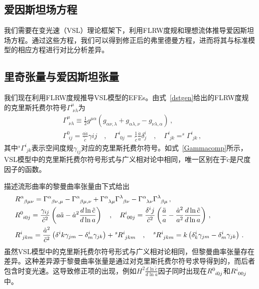 \documentclass[jkps,preprint,fleqn]{revtex4}
\newcommand{\tc}{\tilde{c}}
\begin{document}
\begin{CJK*}{UTF8}{gbsn}
\section{爱因斯坦场方程} \label{sec:EFEs}

我们需要在变光速（VSL）理论框架下，利用FLRW度规和理想流体推导爱因斯坦场方程。通过这些方程，我们可以得到修正后的弗里德曼方程，进而将其与标准模型的相应方程进行对比分析差异。
\subsection{里奇张量与爱因斯坦张量}\label{subsec:RS}
我们现在利用FLRW度规推导VSL模型的EFEs\cite{Lee:2020zts,Lee:2025rpw}。由式~\eqref{dstgen}给出的FLRW度规的克里斯托费尔符号$\Gamma^{\mu}_{\,\,\nu\lambda}$为
\begin{align}
&\Gamma^{\mu}_{\,\,\nu\lambda} \equiv \frac{1}{2} g^{\mu\alpha} \left( g_{\alpha\nu,\lambda} + g_{\alpha\lambda,\nu} - g_{\nu\lambda,\alpha} \right) \label{Gamma}\,, \\ &\Gamma^{0}_{\,\,ij} = \frac{a\dot{a}}{\tc} \gamma{ij} \quad , \quad \Gamma^{i}_{\,\,0j} = \frac{1}{\tc}  \frac{\dot{a}}{a} \delta^i_j \quad , \quad \Gamma^{i}_{\,\,jk} = ^{s}\Gamma^{i}_{\,\,jk}  \label{Gammacomp} \,, \end{align}
其中$^{s}\Gamma^{i}_{\,\,jk}$表示空间度规$\gamma_{ij}$对应的克里斯托费尔符号。如式~\eqref{Gammacomp}所示，VSL模型中的克里斯托费尔符号形式与广义相对论中相同，唯一区别在于$\tc$是尺度因子的函数。

描述流形曲率的黎曼曲率张量由下式给出
\begin{align}
&\tensor{R}{^\alpha_\beta_\mu_\nu} = \tensor{\Gamma}{^\alpha_\beta_\nu_,_\mu} - \tensor{\Gamma}{^\alpha_\beta_\mu_,_\nu} + \tensor{\Gamma}{^\alpha_\lambda_\mu} \tensor{\Gamma}{^\lambda_\beta_\nu} - \tensor{\Gamma}{^\alpha_\lambda_\nu} \tensor{\Gamma}{^\lambda_\beta_\mu} \label{Rabmu} \,, \\ &\tensor{R}{^0_i_0_j} = \frac{\gamma_{ij}}{\tc^2} \left( a \ddot{a} - \dot{a}^2 \frac{d \ln \tc}{d \ln a} \right) \quad , \quad \tensor{R}{^i_0_0_j} = \frac{\delta^{i}{j}}{\tc^2} \left( \frac{\ddot{a}}{a} - \frac{\dot{a}^2}{a^2} \frac{d \ln \tc}{ d \ln a}  \right) \,, \label{R0i0j} \\ &\tensor{R}{^i_j_k_m} = \frac{\dot{a}^2}{\tc^2} \left( \delta^{i}{k} \gamma_{jm} - \delta^i_m \gamma_{jk} \right) + \tensor[^s]{R}{^i_j_k_m} \quad , \quad \tensor[^s]{R}{^i_j_k_m} = k \left( \delta^i_k \gamma_{jm} - \delta^i_m \gamma_{jk} \right) \,. \label{Rijkm} \end{align}
虽然VSL模型中的克里斯托费尔符号形式与广义相对论相同，但黎曼曲率张量存在差异。这种差异源于黎曼曲率张量是通过对克里斯托费尔符号求导得到的，而后者包含时变光速。这导致修正项的出现，例如$H^2 \frac{d \ln \tc}{d \ln a}$因子同时出现在$\tensor{R}{^0_i_0_j}$和$\tensor{R}{^i_0_0_j}$中。


\end{CJK*}
\end{document}
